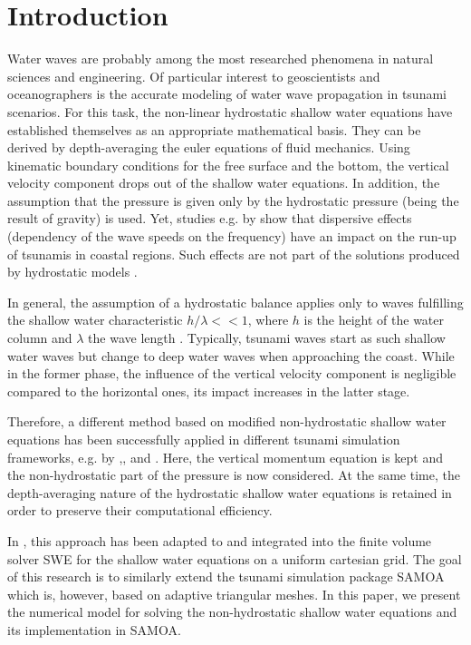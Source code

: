 
\section{Introduction}

Water waves are probably among the most researched phenomena in natural sciences and engineering. Of particular interest to geoscientists and oceanographers is the accurate modeling of water wave propagation in tsunami scenarios. For this task, the non-linear hydrostatic shallow water equations have established themselves as an appropriate mathematical basis. They can be derived by depth-averaging the euler equations of fluid mechanics. Using kinematic boundary conditions for the free surface and the bottom, the vertical velocity component drops out of the shallow water equations. In addition, the assumption that the pressure is given only by the hydrostatic pressure (being the result of gravity) is used. Yet, studies e.g. by \cite{horrillo} show that dispersive effects (dependency of the wave speeds on the frequency) have an impact on the run-up of tsunamis in coastal regions. Such effects are not part of the solutions produced by hydrostatic models \cite{horrillo}. 

In general, the assumption of a hydrostatic balance applies only to waves fulfilling the shallow water characteristic $h/\lambda <<1$, where $h$ is the height of the water column and $\lambda$ the wave length \cite{fuchs}. Typically, tsunami waves start as such shallow water waves but change to deep water waves when approaching the coast. While in the former phase, the influence of the vertical velocity component is negligible compared to the horizontal ones, its impact increases in the latter stage.

Therefore, a different method based on modified non-hydrostatic shallow water equations has been successfully applied in different tsunami simulation frameworks, e.g. by \cite{fuchs},\cite{cui},\cite{walters} and \cite{stelling2003accurate}. Here, the vertical momentum equation is kept and the non-hydrostatic part of the pressure is now considered. At the same time, the depth-averaging nature of the hydrostatic shallow water equations is retained in order to preserve their computational efficiency. 

In \cite{samfass14extension}, this approach has been adapted to and integrated into the finite volume solver SWE for the shallow water equations on a uniform cartesian grid. The goal of this research is to similarly extend the tsunami simulation package SAMOA which is, however, based on adaptive triangular meshes. In this paper, we present the numerical model for solving the non-hydrostatic shallow water equations and its implementation in SAMOA.

